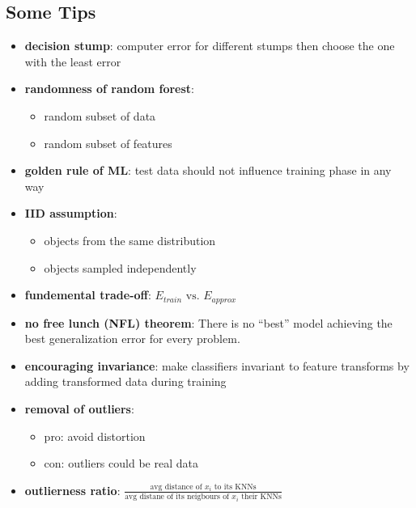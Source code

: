 \documentclass[10pt,landscape,a4paper]{article}
\begin{document}
\begin{multicols*}{5}
\section{Some Tips}
\begin{itemize}
    \item \textbf{decision stump}: computer error for different stumps then choose the one with the least error
    \item \textbf{randomness of random forest}:
    \begin{itemize}
        \item random subset of data
        \item random subset of features
    \end{itemize}
    \item \textbf{golden rule of ML}: test data should not influence training phase in any way
    \item \textbf{IID assumption}:
    \begin{itemize}
        \item objects from the same distribution
        \item objects sampled independently
    \end{itemize}
    \item \textbf{fundemental trade-off}: \(E_{train} \text{ vs. } E_{approx}\)
    \item \textbf{no free lunch (NFL) theorem}: There is no ``best'' model achieving the best generalization error for every problem.
    \item \textbf{encouraging invariance}: make classifiers invariant to feature transforms by adding transformed data during training
    \item \textbf{removal of outliers}:
    \begin{itemize}
        \item pro: avoid distortion
        \item con: outliers could be real data
    \end{itemize}
    \item \textbf{outlierness ratio}: \(\frac{\text{avg distance of } x_i \text{ to its KNNs}}{\text{avg distane of its neigbours of } x_i \text{ their KNNs}}\)
\end{itemize}

\end{multicols*}
\end{document}

